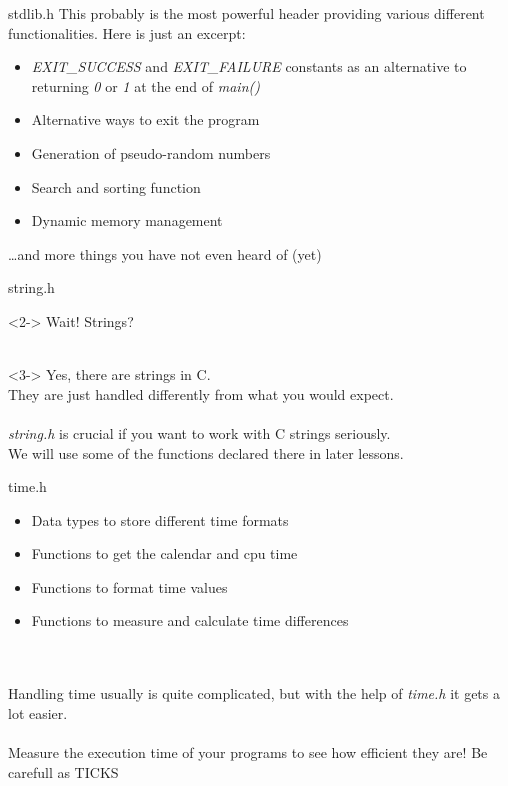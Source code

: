 \begin{frame}{stdlib.h}
	This probably is the most powerful header providing various different functionalities. Here is just an excerpt:
	\begin{itemize}
		\item \textit{EXIT\_SUCCESS} and \textit{EXIT\_FAILURE} constants as an alternative to returning \textit{0} or \textit{1} at the end of \textit{main()}
		\item Alternative ways to exit the program
		\item Generation of pseudo-random numbers
		\item Search and sorting function
		\item Dynamic memory management
	\end{itemize}
		\dots and more things you have not even heard of (yet)
\end{frame}


\begin{frame}{string.h}
	\begin{uncoverenv}<2->
		Wait! Strings? \\ \ \\
	\end{uncoverenv}
	\begin{uncoverenv}<3->
		Yes, there are strings in C. \\
		They are just handled differently from what you would expect. \\ \ \\
		\textit{string.h} is crucial if you want to work with C strings seriously. \\
		We will use some of the functions declared there in later lessons.
	\end{uncoverenv}
\end{frame}


\begin{frame}{time.h}
	\begin{itemize}
		\item Data types to store different time formats
		\item Functions to get the calendar and cpu time
		\item Functions to format time values
		\item Functions to measure and calculate time differences
	\end{itemize} \ \\ \ \\
	Handling time usually is quite complicated, but with the help of \textit{time.h} it gets a lot easier.\\
	\ \\
	Measure the execution time of your programs to see how efficient they are!
	Be carefull as TICKS
\end{frame}

